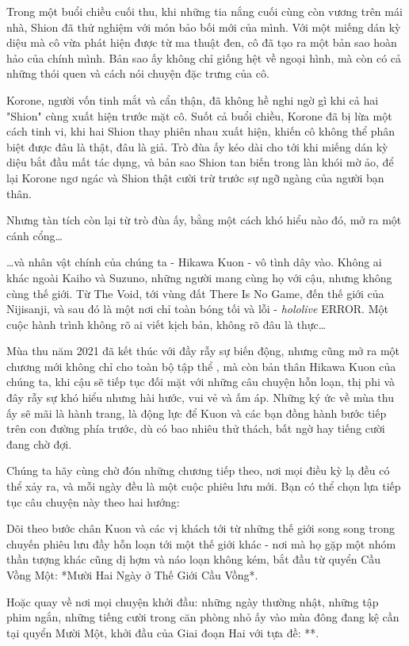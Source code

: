 \documentclass[main.tex]{subfiles}
\begin{document}
\color{black}

Trong một buổi chiều cuối thu, khi những tia nắng cuối cùng còn vương trên mái nhà, Shion đã thử nghiệm với món bảo bối mới của mình. Với một miếng dán kỳ diệu mà cô vừa phát hiện được từ ma thuật đen, cô đã tạo ra một bản sao hoàn hảo của chính mình. Bản sao ấy không chỉ giống hệt về ngoại hình, mà còn có cả những thói quen và cách nói chuyện đặc trưng của cô.

Korone, người vốn tinh mắt và cẩn thận, đã không hề nghi ngờ gì khi cả hai "Shion" cùng xuất hiện trước mặt cô. Suốt cả buổi chiều, Korone đã bị lừa một cách tinh vi, khi hai Shion thay phiên nhau xuất hiện, khiến cô không thể phân biệt được đâu là thật, đâu là giả. Trò đùa ấy kéo dài cho tới khi miếng dán kỳ diệu bắt đầu mất tác dụng, và bản sao Shion tan biến trong làn khói mờ ảo, để lại Korone ngơ ngác và Shion thật cười trừ trước sự ngỡ ngàng của người bạn thân.

Nhưng tàn tích còn lại từ trò đùa ấy, bằng một cách khó hiểu nào đó, mở ra một cánh cổng\dots

\dots và nhân vật chính của chúng ta - Hikawa Kuon - vô tình dây vào. Không ai khác ngoài Kaiho và Suzuno, những người mang cùng họ với cậu, nhưng không cùng thế giới. Từ The Void, tới vùng đất There Is No Game, đến thế giới của Nijisanji, và sau đó là một nơi chỉ toàn bóng tối và lỗi - \textit{hololive} ERROR. Một cuộc hành trình không rõ ai viết kịch bản, không rõ đâu là thực\dots

Mùa thu năm 2021 đã kết thúc với đầy rẫy sự biến động, nhưng cũng mở ra một chương mới không chỉ cho toàn bộ tập thể \hll, mà còn bản thân Hikawa Kuon của chúng ta, khi cậu sẽ tiếp tục đối mặt với những câu chuyện hỗn loạn, thị phi và đây rẫy sự khó hiểu nhưng hài hước, vui vẻ và ấm áp. Những ký ức về mùa thu ấy sẽ mãi là hành trang, là động lực để Kuon và các bạn đồng hành bước tiếp trên con đường phía trước, dù có bao nhiêu thử thách, bất ngờ hay tiếng cười đang chờ đợi.

Chúng ta hãy cùng chờ đón những chương tiếp theo, nơi mọi điều kỳ lạ đều có thể xảy ra, và mỗi ngày đều là một cuộc phiêu lưu mới. Bạn có thể chọn lựa tiếp tục câu chuyện này theo hai hướng:

Dõi theo bước chân Kuon và các vị khách tới từ những thế giới song song trong chuyến phiêu lưu đầy hỗn loạn tới một thế giới khác - nơi mà họ gặp một nhóm thần tượng khác cũng dị hợm và náo loạn không kém, bắt đầu từ quyển Cầu Vồng Một: *Mười Hai Ngày ở Thế Giới Cầu Vồng*.

Hoặc quay về nơi mọi chuyện khởi đầu: những ngày thường nhật, những tập phim ngắn, những tiếng cười trong căn phòng nhỏ ấy vào mùa đông đang kệ cần tại quyển Mười Một, khởi đầu của Giai đoạn Hai với tựa đề: **.
\end{document}
